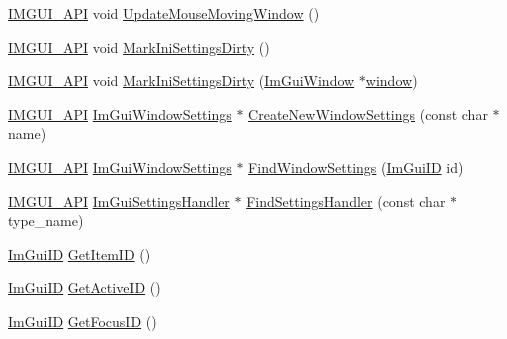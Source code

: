 \begin{DoxyCompactItemize}
\item 
\mbox{\hyperlink{imgui_8h_a43829975e84e45d1149597467a14bbf5}{I\+M\+G\+U\+I\+\_\+\+A\+PI}} void \mbox{\hyperlink{namespace_im_gui_a67808962a8f76d51e7dfc701729f1591}{Update\+Mouse\+Moving\+Window}} ()
\item 
\mbox{\hyperlink{imgui_8h_a43829975e84e45d1149597467a14bbf5}{I\+M\+G\+U\+I\+\_\+\+A\+PI}} void \mbox{\hyperlink{namespace_im_gui_aee9b660c1d6786c00fc47c71c66eb1eb}{Mark\+Ini\+Settings\+Dirty}} ()
\item 
\mbox{\hyperlink{imgui_8h_a43829975e84e45d1149597467a14bbf5}{I\+M\+G\+U\+I\+\_\+\+A\+PI}} void \mbox{\hyperlink{namespace_im_gui_a6b682344c53a8fc93b08b833021a49ee}{Mark\+Ini\+Settings\+Dirty}} (\mbox{\hyperlink{struct_im_gui_window}{Im\+Gui\+Window}} $\ast$\mbox{\hyperlink{radar_8cpp_a80de27bd7dc4e2b2ad3d5895b97a70f0}{window}})
\item 
\mbox{\hyperlink{imgui_8h_a43829975e84e45d1149597467a14bbf5}{I\+M\+G\+U\+I\+\_\+\+A\+PI}} \mbox{\hyperlink{struct_im_gui_window_settings}{Im\+Gui\+Window\+Settings}} $\ast$ \mbox{\hyperlink{namespace_im_gui_a2f325a08e833855b408f70a96d5fa064}{Create\+New\+Window\+Settings}} (const char $\ast$name)
\item 
\mbox{\hyperlink{imgui_8h_a43829975e84e45d1149597467a14bbf5}{I\+M\+G\+U\+I\+\_\+\+A\+PI}} \mbox{\hyperlink{struct_im_gui_window_settings}{Im\+Gui\+Window\+Settings}} $\ast$ \mbox{\hyperlink{namespace_im_gui_a9920e3b99972583f7fed0357b64a3fb2}{Find\+Window\+Settings}} (\mbox{\hyperlink{imgui_8h_a1785c9b6f4e16406764a85f32582236f}{Im\+Gui\+ID}} id)
\item 
\mbox{\hyperlink{imgui_8h_a43829975e84e45d1149597467a14bbf5}{I\+M\+G\+U\+I\+\_\+\+A\+PI}} \mbox{\hyperlink{struct_im_gui_settings_handler}{Im\+Gui\+Settings\+Handler}} $\ast$ \mbox{\hyperlink{namespace_im_gui_ad9e15440c52f63aa96ef3b3938d566f8}{Find\+Settings\+Handler}} (const char $\ast$type\+\_\+name)
\item 
\mbox{\hyperlink{imgui_8h_a1785c9b6f4e16406764a85f32582236f}{Im\+Gui\+ID}} \mbox{\hyperlink{namespace_im_gui_a102bd745dcb69ab33637e25ceeabb444}{Get\+Item\+ID}} ()
\item 
\mbox{\hyperlink{imgui_8h_a1785c9b6f4e16406764a85f32582236f}{Im\+Gui\+ID}} \mbox{\hyperlink{namespace_im_gui_a2577aabfddbb8c092a014cbdcc333204}{Get\+Active\+ID}} ()
\item 
\mbox{\hyperlink{imgui_8h_a1785c9b6f4e16406764a85f32582236f}{Im\+Gui\+ID}} \mbox{\hyperlink{namespace_im_gui_a2657245e3c14385d8caf03e06a8b76aa}{Get\+Focus\+ID}} ()
\item 

\end{DoxyCompactItemize}
